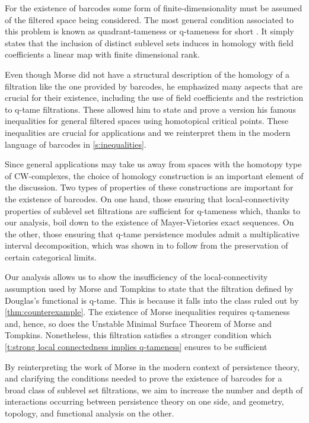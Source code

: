 For the existence of barcodes some form of finite-dimensionality must be assumed of the  filtered space being considered.
The most general condition associated to this problem is known as quadrant-tameness or q-tameness for short \cite{bibid}.
It simply states that the inclusion of distinct sublevel sets induces in homology with field coefficients a linear map with finite dimensional rank.

Even though Morse did not have a structural description of the homology of a filtration like the one provided by barcodes, he emphasized many aspects that are crucial for their existence, including the use of field coefficients and the restriction to q-tame filtrations.
These allowed him to state and prove a version his famous inequalities for general filtered spaces using homotopical critical points.
These inequalities are crucial for applications and we reinterpret them in the modern language of barcodes in \cref{s:inequalities}.

Since general applications may take us away from spaces with the homotopy type of CW-complexes, the choice of homology construction is an important element of the discussion.
Two types of properties of these constructions are important for the existence of barcodes. On one hand, those ensuring that local-connectivity properties of sublevel set filtrations are sufficient for q-tameness which, thanks to our analysis, boil down to the existence of Mayer-Vietories exact sequences.
On the other, those ensuring that q-tame persistence modules admit a multiplicative interval decomposition, which was shown in \cite{schmahl2020structure} to follow from the preservation of certain categorical limits.

Our analysis allows us to show the insufficiency of the local-connectivity assumption used by Morse and Tompkins to state that the filtration defined by Douglas's functional is q-tame.
This is because it falls into the class ruled out by \cref{thm:counterexample}.
The existence of Morse inequalities requires q-tameness and, hence, so does the Unstable Minimal Surface Theorem of Morse and Tompkins.
Nonetheless, this filtration satisfies a stronger condition which \cref{t:strong local connectedness implies q-tameness} ensures to be sufficient 

By reinterpreting the work of Morse in the modern context of persistence theory, and clarifying the conditions needed to prove the existence of barcodes for a broad class of sublevel set filtrations, we aim to increase the number and depth of interactions occurring between persistence theory on one side, and geometry, topology, and functional analysis on the other.

